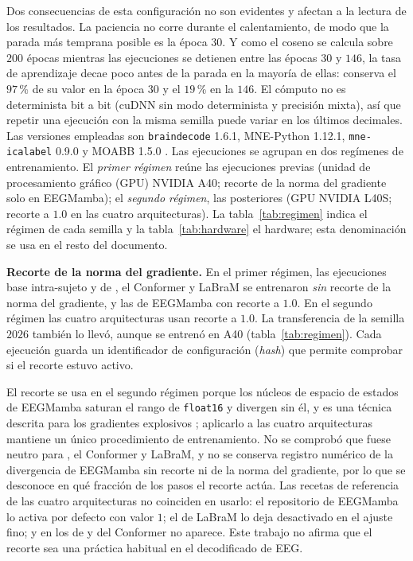Dos consecuencias de esta configuración no son evidentes y afectan a la lectura de los
resultados. La paciencia no corre durante el calentamiento, de modo que la parada más
temprana posible es la época $30$. Y como el coseno se calcula sobre $200$ épocas mientras
las ejecuciones \loso{} se detienen entre las épocas $30$ y $146$, la tasa de aprendizaje
decae poco antes de la parada en la mayoría de ellas: conserva el $97$\,\% de su valor en la
época $30$ y el $19$\,\% en la $146$. El cómputo no es determinista bit a bit (cuDNN sin modo determinista y precisión
mixta), así que repetir una ejecución con la misma semilla puede variar en los últimos
decimales. Las versiones empleadas son \texttt{braindecode} 1.6.1, MNE-Python 1.12.1,
\texttt{mne-icalabel} 0.9.0 y MOABB 1.5.0 \cite{jayaram2018moabb}. Las ejecuciones se
agrupan en dos regímenes de entrenamiento. El \emph{primer régimen} reúne las ejecuciones
previas (unidad de procesamiento gráfico (GPU) NVIDIA A40; recorte de la norma del gradiente solo en EEGMamba); el
\emph{segundo régimen}, las posteriores (GPU NVIDIA L40S; recorte a $1.0$ en las cuatro
arquitecturas). La
tabla~\ref{tab:regimen} indica el régimen de cada semilla y la tabla~\ref{tab:hardware} el
hardware; esta denominación se usa en el resto del documento.

\textbf{Recorte de la norma del gradiente.}\label{sec:recorte-gradiente}
En el primer régimen, las ejecuciones base intra-sujeto y \loso{} de \eegnet{}, el
Conformer y LaBraM se entrenaron \emph{sin} recorte de la norma del gradiente, y las de
EEGMamba con recorte a $1.0$. En el segundo régimen las cuatro arquitecturas usan recorte a
$1.0$. La transferencia de la semilla $2026$ también lo llevó, aunque se entrenó en A40
(tabla~\ref{tab:regimen}). Cada ejecución guarda un identificador de configuración
(\textit{hash}) que permite comprobar si el recorte estuvo activo.

El recorte se usa en el segundo régimen porque los núcleos de espacio de estados de EEGMamba
saturan el rango de \texttt{float16} y divergen sin él, y es una técnica descrita para los
gradientes explosivos \cite{pascanu2013difficulty}; aplicarlo a las cuatro arquitecturas
mantiene un único procedimiento de entrenamiento. No se comprobó que fuese neutro para
\eegnet{}, el Conformer y LaBraM, y no se conserva registro numérico de la divergencia de
EEGMamba sin recorte ni de la norma del gradiente, por lo que se desconoce en qué fracción de
los pasos el recorte actúa. Las recetas de referencia de las cuatro arquitecturas no
coinciden en usarlo: el repositorio de EEGMamba \cite{wang2025eegmamba} lo activa por defecto
con valor $1$; el de LaBraM \cite{jiang2024labram} lo deja desactivado en el ajuste fino; y
en los de \eegnet{} \cite{lawhern2018} y del Conformer \cite{song2023conformer} no aparece.
Este trabajo no afirma que el recorte sea una práctica habitual en el decodificado de EEG.


